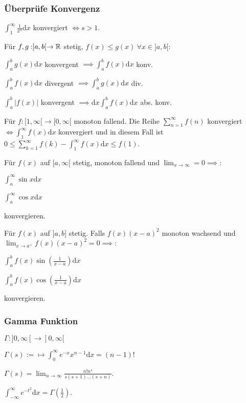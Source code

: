 \subsubsection{Überprüfe Konvergenz}
\begin{compactitem}
    \item $\int_{1}^{\infty} \frac{1}{x^s} \mathrm{d}x$ konvergiert $\iff s > 1$.
    \item Für $f,g: ]a,b[ \to \mathbb{R}$ stetig, $f(x) \le g(x) \ \forall x \in ]a, b[$:
        \begin{compactitem}
            \item $\int_{a}^{b} g(x)\mathrm{d}x$ konvergent $\implies \int_{a}^{b} f(x) \mathrm{d}x$ konv.
            \item $\int_{a}^{b} f(x) \mathrm{d}x$ divergent $\implies \int_{a}^{b} g(x) \mathrm{d}x$ div.
        \end{compactitem}
    \item $\int_{a}^{b} |f(x)|$ konvergent $\implies \mathrm{d}x\int_{a}^{b} f(x) \mathrm{d}x$ abs. konv.
    \item Für $f: [1, \infty[ \to [0, \infty[$ monoton fallend. Die Reihe $\sum_{n=1}^{\infty} f(n)$ konvergiert $\iff \int_{1}^{\infty} f(x) \mathrm{d}x$ konvergiert und in diesem Fall ist $0 \le \sum_{k=1}^{\infty} f(k) - \int_{1}^{\infty} f(x) \mathrm{d}x \le f(1)$.
    \item Für $f(x)$ auf $[a, \infty[$ stetig, monoton fallend und $\lim_{x \to \infty} = 0 \implies$:
        \begin{inparaitem}
            \item $\int_{a}^{\infty} \sin x \mathrm{d}x$
            \item $\int_{a}^{\infty} \cos x \mathrm{d}x$
        \end{inparaitem}
        konvergieren.
    \item Für $f(x)$ auf $]a, b]$ stetig. Falls $f(x)(x-a)^2$ monoton wachsend und $\lim_{x \to a^+} f(x)(x-a)^2 = 0 \implies$:
        \begin{inparaitem}
            \item $\int_{a}^{b} f(x) \sin(\frac{1}{x-a}) \mathrm{d}x$
            \item $\int_{a}^{b} f(x) \cos(\frac{1}{x - a}) \mathrm{d}x$
        \end{inparaitem}
        konvergieren.
\end{compactitem}

\subsubsection{Gamma Funktion}
\begin{compactitem}
    \item $\Gamma: ]0, \infty[ \to ]0, \infty[$
    \item $\Gamma(s) := \mapsto \int_{0}^{\infty} e^{-x}x^{n-1} \mathrm{d}x = (n-1)!$
    \item $\Gamma(s) = \lim_{n \to \infty} \frac{n!n^s}{s(s+1)\dots (s+n)}$.
    \item $\int_{-\infty}^{\infty} e^{-t^2}\mathrm{d}x = \Gamma(\frac{1}{2})$.
\end{compactitem}


